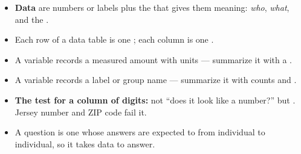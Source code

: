 \documentclass[12pt]{article}
\begin{document}
\boxguard[14]
\begin{tcolorbox}[enhanced, colback=frost, colframe=cerulean, boxrule=0.8pt, arc=2mm,
    left=3mm, right=3mm, top=1.5mm, bottom=1.5mm, breakable,
    fonttitle=\bfseries\small\color{white}, title={QuickNotes: Naming What You Found},
    attach boxed title to top left={yshift=-2mm, xshift=4mm},
    boxed title style={colback=cerulean, colframe=cerulean, arc=1.5mm}]
\small
\begin{itemize}[leftmargin=1.1em, itemsep=5pt]
  \item \textbf{Data} are numbers or labels plus the \blank{2.4cm} that gives them meaning:
        \emph{who}, \emph{what}, and the \blank{1.8cm}.
  \item Each row of a data table is one \blank{2.4cm}; each column is one \blank{2.4cm}.
  \item A \blank{2.6cm} variable records a measured amount with units --- summarize
        it with a \blank{1.8cm}.
  \item A \blank{2.6cm} variable records a label or group name --- summarize it with
        counts and \blank{1.8cm}.
  \item \textbf{The test for a column of digits:} not ``does it look like a number?'' but
        \blank{5.6cm}. Jersey number and ZIP code fail it.
  \item A \blank{2.6cm} question is one whose answers are expected to \blank{1.8cm}
        from individual to individual, so it takes data to answer.
\end{itemize}
\end{tcolorbox}
\end{document}
